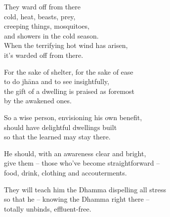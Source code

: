 \begin{english}
  \setlength{\parskip}{\onelineskip}%

  They ward off from there\\
  cold, heat, beasts, prey,\\
  creeping things, mosquitoes,\\
  and showers in the cold season.\\
  When the terrifying hot wind has arisen,\\
  it's warded off from there.

  For the sake of shelter, for the sake of ease\\
  to do jhāna and to see insightfully,\\
  the gift of a dwelling is praised as foremost\\
  by the awakened ones.

  \clearpage

  So a wise person, envisioning his own benefit,\\
  should have delightful dwellings built\\
  so that the learned may stay there.

  He should, with an awareness clear and bright,\\
  give them -- those who've become straightforward --\\
  food, drink, clothing and accouterments.

  They will teach him the Dhamma dispelling all stress\\
  so that he -- knowing the Dhamma right there --\\
  totally unbinds, effluent-free.
\end{english}


